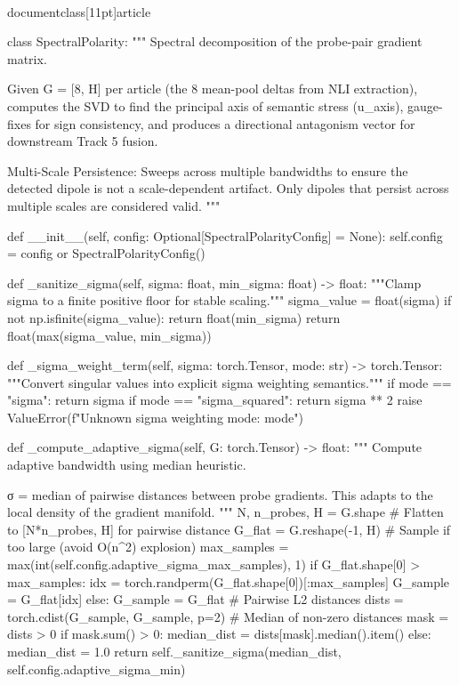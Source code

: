 \\documentclass[11pt]{article}
\begin{document}
\begin{CodeBlock}
class SpectralPolarity:
    """
    Spectral decomposition of the probe-pair gradient matrix.

    Given G = [8, H] per article (the 8 mean-pool deltas from NLI extraction),
    computes the SVD to find the principal axis of semantic stress (u_axis),
    gauge-fixes for sign consistency, and produces a directional antagonism
    vector for downstream Track 5 fusion.

    Multi-Scale Persistence:
    Sweeps across multiple bandwidths to ensure the detected dipole is not
    a scale-dependent artifact. Only dipoles that persist across multiple
    scales are considered valid.
    """

    def __init__(self, config: Optional[SpectralPolarityConfig] = None):
        self.config = config or SpectralPolarityConfig()

    def _sanitize_sigma(self, sigma: float, min_sigma: float) -> float:
        """Clamp sigma to a finite positive floor for stable scaling."""
        sigma_value = float(sigma)
        if not np.isfinite(sigma_value):
            return float(min_sigma)
        return float(max(sigma_value, min_sigma))

    def _sigma_weight_term(self, sigma: torch.Tensor, mode: str) -> torch.Tensor:
        """Convert singular values into explicit sigma weighting semantics."""
        if mode == "sigma":
            return sigma
        if mode == "sigma_squared":
            return sigma ** 2
        raise ValueError(f"Unknown sigma weighting mode: {mode}")

    def _compute_adaptive_sigma(self, G: torch.Tensor) -> float:
        """
        Compute adaptive bandwidth using median heuristic.

        σ = median of pairwise distances between probe gradients.
        This adapts to the local density of the gradient manifold.
        """
        N, n_probes, H = G.shape
        # Flatten to [N*n_probes, H] for pairwise distance
        G_flat = G.reshape(-1, H)
        # Sample if too large (avoid O(n^2) explosion)
        max_samples = max(int(self.config.adaptive_sigma_max_samples), 1)
        if G_flat.shape[0] > max_samples:
            idx = torch.randperm(G_flat.shape[0])[:max_samples]
            G_sample = G_flat[idx]
        else:
            G_sample = G_flat
        # Pairwise L2 distances
        dists = torch.cdist(G_sample, G_sample, p=2)
        # Median of non-zero distances
        mask = dists > 0
        if mask.sum() > 0:
            median_dist = dists[mask].median().item()
        else:
            median_dist = 1.0
        return self._sanitize_sigma(median_dist, self.config.adaptive_sigma_min)


\end{CodeBlock}
\end{document}
